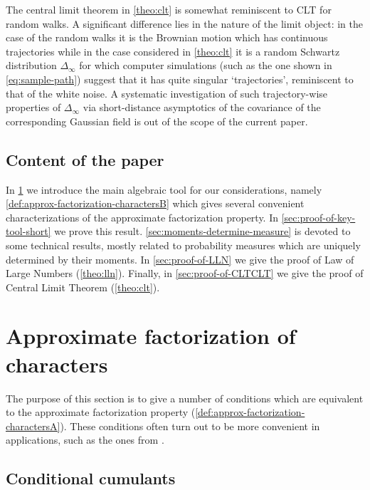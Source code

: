\documentclass[12pt,usenames,dvipsnames,svgnames,table]{amsart}
\begin{document}
\medskip

The central limit theorem in \cref{theo:clt} 
is somewhat reminiscent to CLT for random walks. A significant difference
lies in the nature of the limit object: in the case of the random walks it is
the Brownian motion which has continuous trajectories while in the case considered
in \cref{theo:clt} it is a random Schwartz distribution $\Delta_\infty$
for which computer simulations (such as the one shown in \cref{eq:sample-path})
suggest that it has  quite singular `trajectories', reminiscent to that of the white noise.
A systematic investigation of such trajectory-wise properties of $\Delta_\infty$
via short-distance asymptotics of the covariance of the corresponding Gaussian field
is out of the scope of the current paper.

\subsection{Content of the paper}
In \cref{sec:approx-fact-characters} we introduce the main algebraic
tool for our considerations, namely \cref{def:approx-factorization-charactersB}
which gives several convenient characterizations of
the approximate factorization property.
In \cref{sec:proof-of-key-tool-short} we prove this result.
\cref{sec:moments-determine-measure} is devoted to some technical results, mostly related
to probability measures which are uniquely determined by their moments.
In \cref{sec:proof-of-LLN} we give the proof of Law of Large Numbers (\cref{theo:lln}).
Finally, in \cref{sec:proof-of-CLTCLT} we give the proof of Central Limit Theorem
(\cref{theo:clt}).

\section{Approximate factorization of characters}
\label{sec:approx-fact-characters}

The purpose of this section is to give a number of 
conditions which are equivalent to the approximate factorization property 
(\cref{def:approx-factorization-charactersA}).
These conditions often turn out to be more convenient in 
applications, such as the ones from \cite{DolegaSniady-examples-AFP}.

\subsection{Conditional cumulants}
\label{sec:conditional-cumulants}
\end{document}
